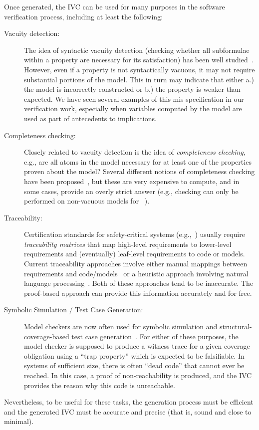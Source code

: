 Once generated, the IVC can be used for many purposes in the software verification process, including at least the following:
\begin{description}
    \item[Vacuity detection:] The idea of syntactic vacuity detection (checking whether all subformulae within a property are necessary for its satisfaction) has been well studied~\cite{Kupferman03:Vacuity}.   However, even if a property is not syntactically vacuous, it may not require substantial portions of the model.  This in turn may indicate that either a.) the model is incorrectly constructed or b.) the property is weaker than expected.  We have seen several examples of this mis-specification in our verification work, especially when variables computed by the model are used as part of antecedents to implications.
    \item[Completeness checking:] Closely related to vacuity detection is the idea of {\em completeness checking}, e.g., are all atoms in the model necessary for at least one of the properties proven about the model?  Several different notions of completeness checking have been proposed~\cite{chockler_coverage_2003, kupferman_theory_2008}, but these are very expensive to compute, and in some cases, provide an overly strict answer (e.g., checking can only be performed on non-vacuous models for~\cite{kupferman_theory_2008} ).
    \item[Traceability:] Certification standards for safety-critical systems (e.g.,~\cite{DO178C,MOD:00-55}) usually require {\em traceability matrices} that map high-level requirements to lower-level requirements and (eventually) leaf-level requirements to code or models.  Current traceability approaches involve either manual mappings between requirements and code/models~\cite{SimulinkTraceability} or a heuristic approach involving natural language processing~\cite{Keenan12:Tracelab}.  Both of these approaches tend to be inaccurate.  The proof-based approach can provide this information accurately and for free.
    \item[Symbolic Simulation / Test Case Generation:]  Model checkers are now often used for symbolic simulation and structural-coverage-based test case generation~\cite{SimulinkDesignVerifier,Whalen13:OMCDC}.  For either of these purposes, the model checker is supposed to produce a witness trace for a given coverage obligation using a ``trap property'' which is expected to be falsifiable.  In systems of sufficient size, there is often ``dead code'' that cannot ever be reached.  In this case, a proof of non-reachability is produced, and the IVC provides the reason why this code is unreachable.
\end{description}
\noindent Nevertheless, to be useful for these tasks, the generation
process must be efficient and the generated IVC must be
accurate and precise (that is, sound and close to minimal).

